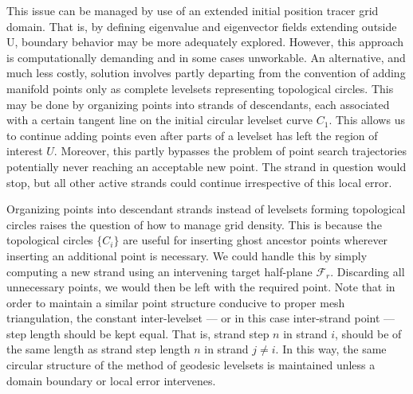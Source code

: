 This issue can be managed by use of an extended initial position tracer grid domain. That is, by defining eigenvalue and eigenvector fields extending outside
U, boundary behavior may be more adequately explored. However, this approach is computationally demanding and in some cases unworkable. An alternative, and much less costly, solution involves partly departing from the convention of adding
manifold points only as complete levelsets representing topological circles. This may be done by organizing points into strands of descendants, each associated with a certain tangent line on the initial circular levelset curve $C_1$. This allows us to continue adding points even after parts of a levelset has left the region of interest $U$. Moreover, this partly bypasses the problem of point search trajectories potentially never reaching an acceptable new point. The strand in question would stop, but all other active strands could continue irrespective of this local error.

Organizing points into descendant strands instead of levelsets forming topological circles raises the question of how to manage grid density. This is because the topological circles $\{C_i\}$ are useful for inserting ghost ancestor points wherever inserting an additional point is necessary. We could handle this by simply computing a new strand using an intervening target half-plane $\mathcal{F}_r$. Discarding all unnecessary points, we would then be left with the required point. Note that in order to maintain a similar point structure conducive to proper mesh triangulation, the constant inter-levelset --- or in this case inter-strand point --- step length should be kept equal. That is, strand step $n$ in strand $i$, should be of the same length as strand step length $n$ in strand $j\neq i$. In this way, the same circular structure of the method of geodesic levelsets is maintained unless a domain boundary or local error intervenes.

